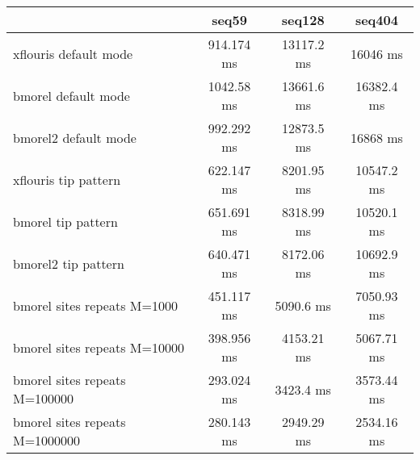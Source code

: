 \begin{tabular}{|l|c|c|c|}
\hline
 & seq59 & seq128 & seq404 \\
\hline
xflouris default mode & 914.174 ms & 13117.2 ms & 16046 ms\\
\hline
bmorel default mode & 1042.58 ms & 13661.6 ms & 16382.4 ms\\
\hline
bmorel2 default mode & 992.292 ms & 12873.5 ms & 16868 ms\\
\hline
xflouris tip pattern & 622.147 ms & 8201.95 ms & 10547.2 ms\\
\hline
bmorel tip pattern & 651.691 ms & 8318.99 ms & 10520.1 ms\\
\hline
bmorel2 tip pattern & 640.471 ms & 8172.06 ms & 10692.9 ms\\
\hline
bmorel sites repeats M=1000 & 451.117 ms & 5090.6 ms & 7050.93 ms\\
\hline
bmorel sites repeats M=10000 & 398.956 ms & 4153.21 ms & 5067.71 ms\\
\hline
bmorel sites repeats M=100000 & 293.024 ms & 3423.4 ms & 3573.44 ms\\
\hline
bmorel sites repeats M=1000000 & 280.143 ms & 2949.29 ms & 2534.16 ms\\
\hline
\end{tabular}
